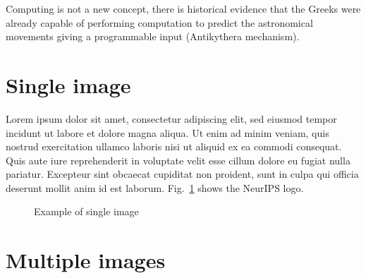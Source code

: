 \documentclass{article}
\begin{document}
Computing is not a new concept, there is historical evidence that the Greeks were already capable of performing computation to predict the astronomical movements giving a programmable input (Antikythera mechanism).



\section{Single image}

Lorem ipsum dolor sit amet, consectetur adipiscing elit, sed eiusmod tempor incidunt ut labore et dolore magna aliqua. Ut enim ad minim veniam, quis nostrud exercitation ullamco laboris nisi ut aliquid ex ea commodi consequat. Quis aute iure reprehenderit in voluptate velit esse cillum dolore eu fugiat nulla pariatur. Excepteur sint obcaecat cupiditat non proident, sunt in culpa qui officia deserunt mollit anim id est laborum. Fig.~\ref{image1} shows the NeurIPS logo.


\begin{figure}[H]
  \caption{Example of single image}
  \label{image1}
\end{figure}



\section{Multiple images}
\end{document}
